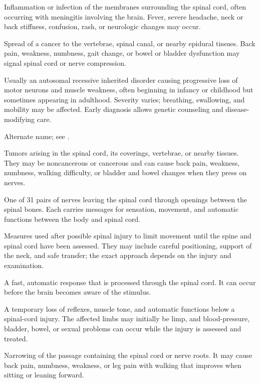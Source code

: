  Inflammation or infection of the membranes surrounding the spinal cord, often occurring with meningitis involving the brain. Fever, severe headache, neck or back stiffness, confusion, rash, or neurologic changes may occur.

 Spread of a cancer to the vertebrae, spinal canal, or nearby epidural tissues. Back pain, weakness, numbness, gait change, or bowel or bladder dysfunction may signal spinal cord or nerve compression.

 Usually an autosomal recessive inherited disorder causing progressive loss of motor neurons and muscle weakness, often beginning in infancy
or childhood but sometimes appearing in adulthood. Severity varies; breathing, swallowing, and mobility
may be affected. Early diagnosis allows genetic counseling and disease-modifying care.

 Alternate name; see .

 Tumors arising in the spinal cord, its coverings, vertebrae, or nearby tissues. They may be noncancerous or cancerous and can cause back pain, weakness, numbness, walking difficulty, or bladder and bowel changes when they press on nerves.

 One of 31 pairs of nerves leaving the spinal cord through openings between the spinal bones. Each carries messages for sensation, movement, and automatic functions between the body and spinal cord.

 Measures used after possible spinal injury to limit movement until the spine and spinal cord have been assessed. They may include careful positioning, support of the neck, and safe transfer; the exact approach depends on the injury and examination.

 A fast, automatic response that is processed through the spinal cord. It can occur before the brain becomes aware of the stimulus.

 A temporary loss of reflexes, muscle tone, and automatic functions below a spinal-cord injury. The affected limbs may initially be limp, and blood-pressure, bladder, bowel, or sexual problems can occur while the injury is assessed and treated.

 Narrowing of the passage containing the spinal cord or nerve roots. It may cause back pain, numbness, weakness, or leg pain with walking that improves when sitting or leaning forward.

